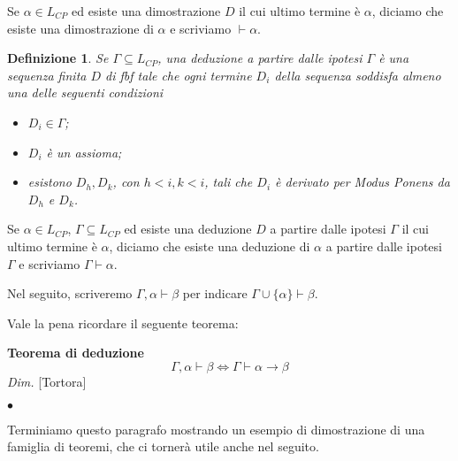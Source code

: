 \documentclass[a4paper, titlepage, 12pt]{report}
\newtheorem{definition}{Definizione}
\begin{document}
Se $\alpha \in L_{CP}$ ed esiste una dimostrazione $D$ il cui ultimo termine è $\alpha$,
diciamo che esiste una dimostrazione di $\alpha$ e scriviamo $\vdash \alpha$.


\begin{definition}
Se $\Gamma \subseteq L_{CP}$, una deduzione a partire dalle ipotesi $\Gamma$ è una sequenza finita $D$
di fbf tale che ogni termine $D_i$ della sequenza soddisfa almeno una delle seguenti condizioni
\begin{itemize}
\item $D_i \in \Gamma$;
\item $D_i$ è un assioma;
\item esistono $D_h, D_k$, con $h < i, k < i$, tali che $D_i$ è derivato per \textit{Modus Ponens}
da $D_h$ e $D_k$.
\end{itemize}
\end{definition}

Se $\alpha \in L_{CP}$, $\Gamma \subseteq L_{CP}$ ed esiste una deduzione $D$ a partire dalle ipotesi $\Gamma$
il cui ultimo termine è $\alpha$, diciamo che esiste una deduzione di $\alpha$
a partire dalle ipotesi $\Gamma$ e scriviamo $\Gamma \vdash \alpha$.

Nel seguito, scriveremo $\Gamma, \alpha \vdash \beta$
per indicare $\Gamma \cup \{\alpha\} \vdash \beta$.

Vale la pena ricordare il seguente teorema:
\begin{flushleft}
\textbf{Teorema di deduzione}
$$\Gamma, \alpha \vdash \beta \Leftrightarrow \Gamma \vdash \alpha \rightarrow \beta$$
\textit{Dim.} [Tortora]
\begin{flushright}
$\bullet$
\end{flushright}
\end{flushleft}


Terminiamo questo paragrafo mostrando un esempio di dimostrazione di una famiglia
di teoremi, che ci tornerà utile anche nel seguito.
\end{document}
